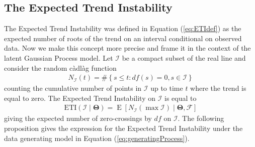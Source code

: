 \documentclass[
  11pt,
]{article}
\theoremstyle{nonumberplain}
\begin{document}
\hypertarget{the-expected-trend-instability}{%
\subsection{The Expected Trend
Instability}\label{the-expected-trend-instability}}

The Expected Trend Instability was defined in Equation (\ref{eq:ETIdef})
as the expected number of roots of the trend on an interval conditional
on observed data. Now we make this concept more precise and frame it in
the context of the latent Gaussian Process model. Let \(\mathcal{I}\) be
a compact subset of the real line and consider the random càdlàg
function \begin{align*}
  N_\mathcal{I}(t) = \#\left\{s \leq t : df(s) = 0, s \in \mathcal{I}\right\}
\end{align*} counting the cumulative number of points in \(\mathcal{I}\)
up to time \(t\) where the trend is equal to zero. The Expected Trend
Instability on \(\mathcal{I}\) is equal to \begin{align*}
  \mathrm{ETI}(\mathcal{I} \mid \bm{\Theta}) = \mathop{\mathrm{E}}\left[N_{\mathcal{I}}\left(\max \mathcal{I}\right) \mid \bm{\Theta}, \mathcal{F}\right]
\end{align*} giving the expected number of zero-crossings by \(df\) on
\(\mathcal{I}\). The following proposition gives the expression for the
Expected Trend Instability under the data generating model in Equation
(\ref{eq:generatingProcess}).

\vspace{0.2cm}
\end{document}
